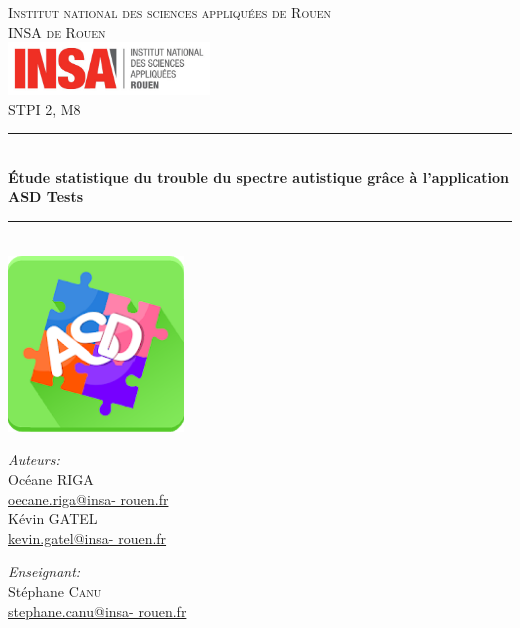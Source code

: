 \documentclass[12,french]{report}
\newcommand{\HRule}{\rule{\linewidth}{0.5mm}}
\begin{document}
\hypersetup{pdfborder=0 0 0}

\begin{titlepage}

\begin{center}
	\textsc{{\LARGE Institut national des sciences appliquées de Rouen} \\ 			\vspace{6mm} {\Large INSA de Rouen}} \\
	\vspace{5mm}
	\includegraphics[width=0.4\textwidth]{./Images/insa}\\[1.0 cm]

	\textsc{\Large STPI 2, M8}\\[0.5cm]

	\HRule \\[0.4cm]
	{ \huge \bfseries Étude statistique du trouble du spectre autistique grâce à l'application ASD Tests}\\[0.4cm]

	\HRule \\[1cm]

	\includegraphics[width=0.35\textwidth]{./Images/asd tests}\\[0.9 cm]

	\begin{minipage}{0.4\textwidth}
		\begin{flushleft} \large
			\emph{Auteurs:}\\
			Océane \textsc{RIGA} \\
			{\small\href{mailto:oecane.riga@insa-rouen.fr}{oecane.riga@insa-				rouen.fr}} \\
			Kévin \textsc{GATEL} \\
			{\small\href{mailto:kevin.gatel@insa-rouen.fr}{kevin.gatel@insa-				rouen.fr}}
		\end{flushleft}
	\end{minipage}
	\begin{minipage}{0.4\textwidth}
		\begin{flushright} \large
			\emph{Enseignant:} \\
			Stéphane \textsc{Canu} \\
			{\small\href{mailto:stephane.canu@insa-rouen.fr}								{stephane.canu@insa-			rouen.fr}}
		\end{flushright}
	\end{minipage}


\end{center}
\end{titlepage}
\end{document}
